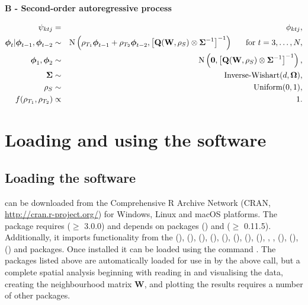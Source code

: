 \documentclass[article, nojss]{jss}
\newcommand{\bd}[1]{\ensuremath{\mbox{\boldmath $#1$}}}
\begin{document}
\noindent\textbf{B - Second-order autoregressive process}

\begin{eqnarray}
\psi_{ktj}&=&\phi_{ktj},\\
\bd{\phi}_t|\bd{\phi}_{t-1}, \bd{\phi}_{t-2} & \sim & \mbox{N}\left(\rho_{T_1}\boldsymbol{\phi}_{t-1}+\rho_{T_2}\boldsymbol{\phi}_{t-2}, \left[\mathbf{Q}(\mathbf{W}, \rho_S)\otimes \boldsymbol{\Sigma}^{-1}\right]^{-1}\right)~~~~~\mbox{for }t=3,\ldots,N,\nonumber\\
\bd{\phi}_1, \bd{\phi}_2 & \sim & \mbox{N}\left(\mathbf{0}, \left[\mathbf{Q}(\mathbf{W}, \rho_S)\otimes \boldsymbol{\Sigma}^{-1}\right]^{-1}\right),\nonumber\\
\boldsymbol{\Sigma}&\sim&\mbox{Inverse-Wishart}(d, \boldsymbol{\Omega}),\nonumber\\
\rho_S&\sim&\mbox{Uniform}(0,1),\nonumber\\
f(\rho_{T_1}, \rho_{T_2})&\propto& 1.\nonumber
\end{eqnarray}

\section{Loading and using the software}\label{section4}

\subsection{Loading the software}
 can be downloaded from the Comprehensive R Archive Network (CRAN, \url{http://cran.r-project.org/}) for Windows, Linux and macOS platforms.  The package requires  ($\geq$ 3.0.0) and depends on packages  (\citealp{mass2002}) and  ($\geq$ 0.11.5). Additionally, it imports functionality from the  (\citealp{carbayesdata}),   (\citealp{coda2006}),  (\citealp{dplyr2015}),  (\citealp{gtools}),  (\citealp{leaflet}),   (\citealp{matrixcalc2012}),  (\citealp{bivand2013}),  (\citealp{spam2010}), , ,  (\citealp{testthat}),  (\citealp{truncdist2012}),  (\citealp{truncnorm2014}) and  packages. Once installed it can be loaded using the command . The packages listed above are automatically loaded for use in  by the above call, but a complete spatial analysis beginning with reading in and visualising the data, creating the neighbourhood matrix $\mathbf{W}$, and plotting the results requires a number of other packages.
\end{document}
